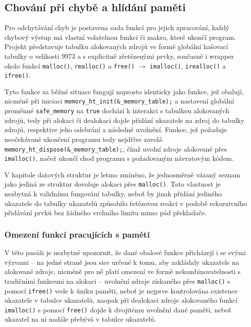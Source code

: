 \documentclass[a4paper, 11pt]{article}
\begin{document}
\subsection{Chování při chybě a hlídání paměti}

Pro odchytávání chyb je postavena sada funkcí pro jejich zpracování, každý chybový výstup má vlastní volatelnou funkci či makro, které ukončí program. 
Projekt představuje tabulku alokovaných zdrojů ve formě globální hašovací tabulky o velikosti 9973 a s explicitně zřetězenými prvky, současně i wrapper okolo funkcí \verb|malloc()|, \verb|realloc()| a \verb|free()| $\rightarrow$ \verb|imalloc()|, \verb|irealloc()| a \verb|ifree()|. 

Tyto funkce za běžné situace fungují naprosto identicky jako funkce, jež obalují, nicméně při iniciaci \verb|memory_ht_init(&_memory_table);| a nastavení globální proměnné \verb|safe_memory| na \verb|true| dochází k interakci s tabulkou alokovaných zdrojů, tedy při alokaci či dealokaci dojde přidání ukazatele na zdroj do tabulky zdrojů, respektive jeho odebrání a následné uvolnění. 
Funkce, jež požaduje neočekávané ukončení programu tedy nejdříve zavolá \verb|memory_ht_dispose(&_memory_table);|, čímž uvolní zdroje alokované přes \verb|imalloc()|, načež ukončí chod programu s požadovaným návratovým kódem. 

V kapitole datových struktur je letmo zmíněno, že jednosměrně vázaný seznam jako jediná ze struktur dovoluje alokaci přes \verb|malloc()|. 
Tato vlastnost je nezbytná k validnímu fungování tabulky, neboť by jinak přidání jediného ukazatele do tabulky ukazatelů způsobilo řetězovou reakci v podobě rekurzivního přidávání prvků bez žádného vrchního limitu mimo pád překladače.

\subsubsection{Omezení funkcí pracujících s pamětí}

V této pasáži je nezbytné upozornit, že dané obalové funkce přicházejí i se svými výzvami \--- na jedné straně jsou sice určené k tomu, aby zakládaly ukazatele na alokované zdroje, nicméně pro ně platí omezení ve formě nekombinovatelnosti s tradičními funkcemi na alokaci \--- uvolnění zdroje získaného přes \verb|malloc()| s pomocí \verb|ifree()| vede k úniku paměti, neboť je nejprve kontrolována existence ukazatele v tabulce ukazatelů, naopak při dealokaci zdroje alokovaného funkcí \verb|imalloc()| s pomocí \verb|free()| dojde k dvojitému uvolnění dané paměti, neboť ukazatel na ni nadále přebývá v tabulce ukazatelů.
\end{document}
